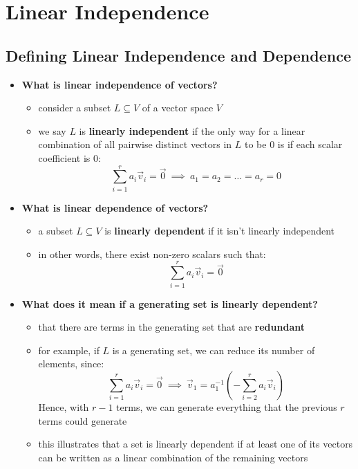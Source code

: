 \documentclass{exam}
\begin{document}
\section{Linear Independence}

\subsection{Defining Linear Independence and Dependence}

\begin{itemize}
    \item \textbf{What is linear independence of vectors?}
    \begin{itemize}
        \item consider a subset $L \subseteq V$ of a vector space $V$
        \item we say $L$ is \textbf{linearly independent} if the only way for a linear combination of all pairwise distinct vectors in $L$ to be 0 is if each scalar coefficient is 0:
        \[
        \sum_{i = 1}^r a_i\vec{v}_i = \vec{0} \ \implies \ a_1 = a_2 = \ldots = a_r = 0
        \]
    \end{itemize}
    \item \textbf{What is linear dependence of vectors?}
    \begin{itemize}
        \item a subset $L \subseteq V$ is \textbf{linearly dependent} if it isn't linearly independent
        \item in other words, there exist non-zero scalars such that:
        \[
        \sum_{i = 1}^r a_i\vec{v}_i = \vec{0}
        \]
    \end{itemize}
    \item \textbf{What does it mean if a generating set is linearly dependent?}
    \begin{itemize}
        \item that there are terms in the generating set that are \textbf{redundant}
        \item for example, if $L$ is a generating set, we can reduce its number of elements, since:
        \[
        \sum_{i = 1}^r a_i\vec{v}_i = \vec{0} \ \implies \ \vec{v}_1 = a_1^{-1}\left(-\sum_{i = 2}^r a_i\vec{v}_i\right)
        \]
        Hence, with $r - 1$ terms, we can generate everything that the previous $r$ terms could generate
        \item this illustrates that a set is linearly dependent if at least one of its vectors can be written as a linear combination of the remaining vectors
    \end{itemize}
\end{itemize}
\end{document}
